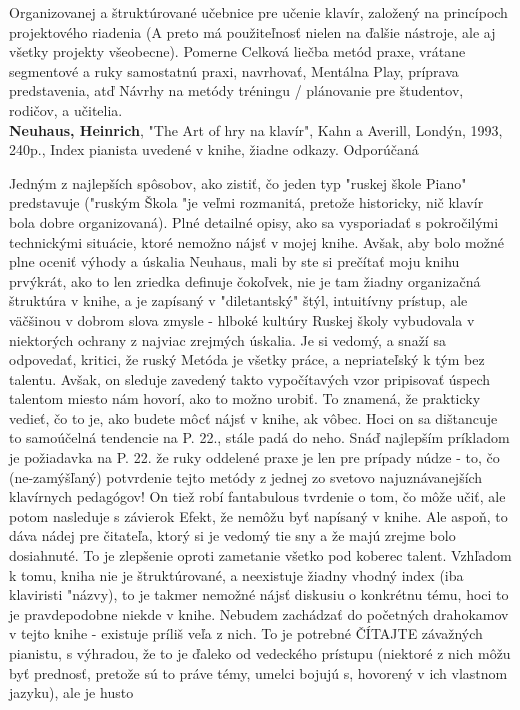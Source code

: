 \documentclass[11pt,a4paper%
]{article}
\begin{document}
Organizovanej a štruktúrované učebnice pre učenie klavír, založený na princípoch projektového riadenia (A preto má použiteľnosť nielen na ďalšie nástroje, ale aj všetky projekty všeobecne). Pomerne Celková liečba metód praxe, vrátane segmentové a ruky samostatnú praxi, navrhovať,
Mentálna Play, príprava predstavenia, atď Návrhy na metódy tréningu / plánovanie pre študentov, rodičov, a učitelia.
\medskip\\
\textbf{Neuhaus, Heinrich}, "The Art of hry na klavír", Kahn a Averill, Londýn, 1993, 240p., Index pianista uvedené v knihe, žiadne odkazy. Odporúčaná

Jedným z najlepších spôsobov, ako zistiť, čo jeden typ "ruskej škole Piano" predstavuje ("ruským
Škola "je veľmi rozmanitá, pretože historicky, nič klavír bola dobre organizovaná). Plné detailné
opisy, ako sa vysporiadať s pokročilými technickými situácie, ktoré nemožno nájsť v mojej knihe. Avšak, aby bolo možné plne oceniť výhody a úskalia Neuhaus, mali by ste si prečítať moju knihu prvýkrát, ako to len zriedka definuje čokoľvek, nie je tam žiadny organizačná štruktúra v knihe, a je zapísaný v "diletantský" štýl, intuitívny prístup, ale väčšinou v dobrom slova zmysle - hlboké kultúry Ruskej školy vybudovala v niektorých ochrany z najviac zrejmých úskalia. Je si vedomý, a snaží sa odpovedať, kritici, že ruský Metóda je všetky práce, a nepriateľský k tým bez talentu. Avšak, on sleduje zavedený takto vypočítavých vzor pripisovať úspech talentom miesto nám hovorí, ako to možno urobiť. To znamená, že prakticky vedieť, čo to je, ako budete môcť nájsť v knihe, ak vôbec. Hoci on sa dištancuje to samoúčelná tendencie na P. 22., stále padá do neho. Snáď najlepším príkladom je požiadavka na P. 22. že ruky oddelené praxe je len pre prípady núdze - to, čo (ne-zamýšľaný) potvrdenie tejto metódy z jednej zo svetovo najuznávanejších klavírnych pedagógov! On tiež robí fantabulous tvrdenie o tom, čo môže učiť, ale potom nasleduje s závierok Efekt, že nemôžu byť napísaný v knihe. Ale aspoň, to dáva nádej pre čitateľa, ktorý si je vedomý tie sny a že majú zrejme bolo dosiahnuté. To je zlepšenie oproti zametanie všetko pod koberec talent. Vzhľadom k tomu, kniha nie je štruktúrované, a neexistuje žiadny vhodný index (iba klaviristi "názvy), to je takmer nemožné nájsť diskusiu o konkrétnu tému, hoci to je pravdepodobne
niekde v knihe.
Nebudem zachádzať do početných drahokamov v tejto knihe - existuje príliš veľa z nich. To je potrebné
ČÍTAJTE závažných pianistu, s výhradou, že to je ďaleko od vedeckého prístupu (niektoré z nich môžu byť
prednosť, pretože sú to práve témy, umelci bojujú s, hovorený v ich vlastnom jazyku), ale je husto
\end{document}
